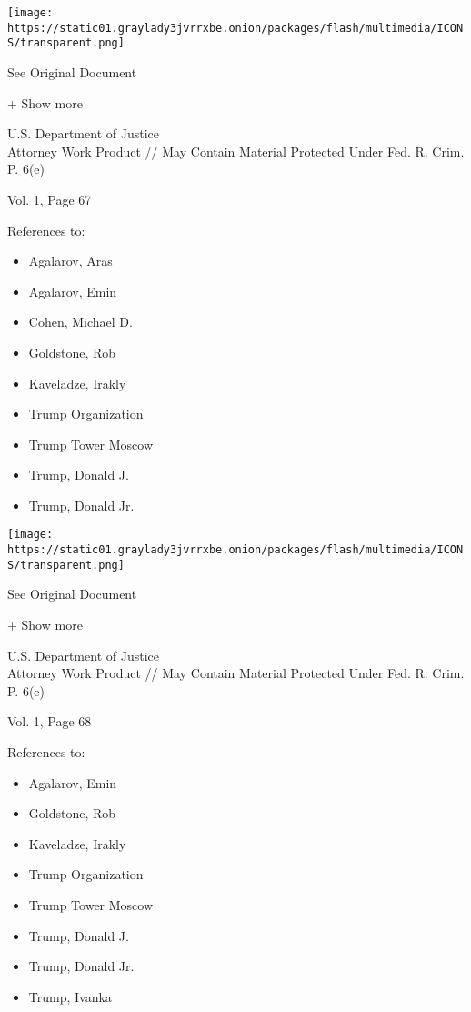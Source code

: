 \protect\hyperlink{}{}

\texttt{[image: https://static01.graylady3jvrrxbe.onion/packages/flash/multimedia/ICONS/transparent.png]}

See Original Document

+ Show more

U.S. Department of Justice\\
Attorney Work Product // May Contain Material Protected Under Fed. R.
Crim. P. 6(e)

Vol. 1, Page 67

References to:

\begin{itemize}
\tightlist
\item
  Agalarov, Aras
\item
  Agalarov, Emin
\item
  Cohen, Michael D.
\item
  Goldstone, Rob
\item
  Kaveladze, Irakly
\item
  Trump Organization
\item
  Trump Tower Moscow
\item
  Trump, Donald J.
\item
  Trump, Donald Jr.
\end{itemize}

\protect\hyperlink{}{}

\texttt{[image: https://static01.graylady3jvrrxbe.onion/packages/flash/multimedia/ICONS/transparent.png]}

See Original Document

+ Show more

U.S. Department of Justice\\
Attorney Work Product // May Contain Material Protected Under Fed. R.
Crim. P. 6(e)

Vol. 1, Page 68

References to:

\begin{itemize}
\tightlist
\item
  Agalarov, Emin
\item
  Goldstone, Rob
\item
  Kaveladze, Irakly
\item
  Trump Organization
\item
  Trump Tower Moscow
\item
  Trump, Donald J.
\item
  Trump, Donald Jr.
\item
  Trump, Ivanka
\end{itemize}

